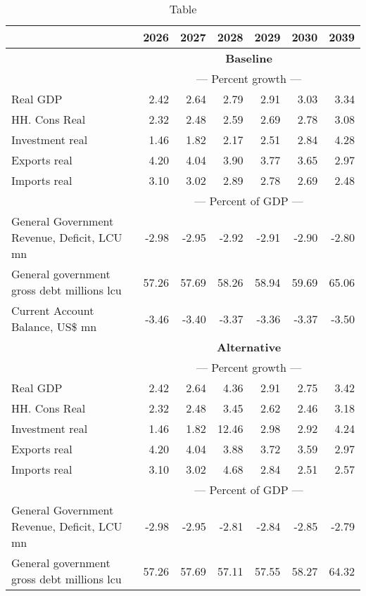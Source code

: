 \documentclass{article}
\begin{document}
\begin{table}[ht]
\caption{Table}
\begin{tabular}{lrrrrr|r}
\toprule
 & 2026 & 2027 & 2028 & 2029 & 2030 & 2039 \\
\midrule
&\multicolumn{6}{c}{{\large \textbf{Baseline}}}                               \\
&\multicolumn{6}{c}{{---  Percent growth ---}}                               \\
Real GDP & 2.42 & 2.64 & 2.79 & 2.91 & 3.03 & 3.34 \\
HH. Cons Real & 2.32 & 2.48 & 2.59 & 2.69 & 2.78 & 3.08 \\
Investment real & 1.46 & 1.82 & 2.17 & 2.51 & 2.84 & 4.28 \\
Exports real & 4.20 & 4.04 & 3.90 & 3.77 & 3.65 & 2.97 \\
Imports real & 3.10 & 3.02 & 2.89 & 2.78 & 2.69 & 2.48 \\
&\multicolumn{6}{c}{{---  Percent of GDP ---}}                               \\
General Government Revenue, Deficit, LCU mn & -2.98 & -2.95 & -2.92 & -2.91 & -2.90 & -2.80 \\
General government gross debt millions lcu & 57.26 & 57.69 & 58.26 & 58.94 & 59.69 & 65.06 \\
Current Account Balance, US\$ mn & -3.46 & -3.40 & -3.37 & -3.36 & -3.37 & -3.50 \\
&\multicolumn{6}{c}{{\large \textbf{Alternative}}}                               \\
&\multicolumn{6}{c}{{---  Percent growth ---}}                               \\
Real GDP & 2.42 & 2.64 & 4.36 & 2.91 & 2.75 & 3.42 \\
HH. Cons Real & 2.32 & 2.48 & 3.45 & 2.62 & 2.46 & 3.18 \\
Investment real & 1.46 & 1.82 & 12.46 & 2.98 & 2.92 & 4.24 \\
Exports real & 4.20 & 4.04 & 3.88 & 3.72 & 3.59 & 2.97 \\
Imports real & 3.10 & 3.02 & 4.68 & 2.84 & 2.51 & 2.57 \\
&\multicolumn{6}{c}{{---  Percent of GDP ---}}                               \\
General Government Revenue, Deficit, LCU mn & -2.98 & -2.95 & -2.81 & -2.84 & -2.85 & -2.79 \\
General government gross debt millions lcu & 57.26 & 57.69 & 57.11 & 57.55 & 58.27 & 64.32 \\

\end{tabular}
\end{table}
\end{document}
